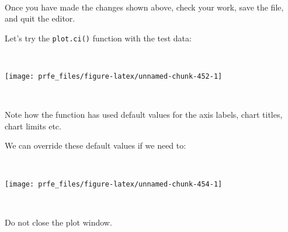 \documentclass[
  12pt,
  a4paper]{book}
\newenvironment{Shaded}{\begin{snugshade}}{\end{snugshade}}
\newcommand{\AttributeTok}[1]{\textcolor[rgb]{0.77,0.63,0.00}{#1}}
\newcommand{\DecValTok}[1]{\textcolor[rgb]{0.00,0.00,0.81}{#1}}
\newcommand{\FunctionTok}[1]{\textcolor[rgb]{0.00,0.00,0.00}{#1}}
\newcommand{\NormalTok}[1]{#1}
\newcommand{\SpecialCharTok}[1]{\textcolor[rgb]{0.00,0.00,0.00}{#1}}
\newcommand{\StringTok}[1]{\textcolor[rgb]{0.31,0.60,0.02}{#1}}
\begin{document}
~

Once you have made the changes shown above, check your work, save the file, and quit the editor.

\newpage

Let's try the \texttt{plot.ci()} function with the test data:

~

\begin{Shaded}
\end{Shaded}

\begin{center}\texttt{[image: prfe\_files/figure-latex/unnamed-chunk-452-1]} \end{center}

~

Note how the function has used default values for the axis labels, chart titles, chart limits etc.

We can override these default values if we need to:

~

\begin{Shaded}
\end{Shaded}

\newpage

\begin{center}\texttt{[image: prfe\_files/figure-latex/unnamed-chunk-454-1]} \end{center}

~

Do not close the plot window.
\end{document}
